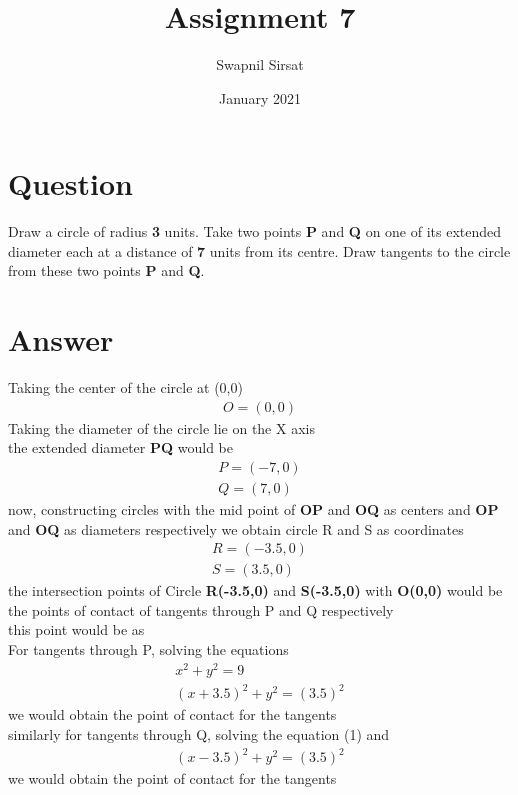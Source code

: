 \documentclass{article}
\title{Assignment 7}
\author{Swapnil Sirsat}
\date{January 2021}
\begin{document}
\maketitle

\section*{Question}
Draw a circle of radius \textbf{3} units. Take two points
\textbf{P} and \textbf{Q} on one of its extended diameter each
at a distance of \textbf{7} units from its centre. Draw
tangents to the circle from these two points \textbf{P}
and \textbf{Q}.
\section*{Answer}
Taking the center of the circle at (0,0)
\begin{gather*}
    O = (0,0)
\end{gather*}
Taking the diameter of the circle lie on the X axis \\
the extended diameter \textbf{PQ} would be
\begin{gather*}
    P = (-7,0)\\
    Q = (7,0)
\end{gather*}
now, constructing circles with the mid point of \textbf{OP} and \textbf{OQ} as centers and  \textbf{OP} and \textbf{OQ} as diameters respectively we obtain circle R and S as coordinates
\begin{gather*}
    R = (-3.5,0)\\
    S = (3.5,0)
\end{gather*}
the intersection points of Circle \textbf{R(-3.5,0)} and \textbf{S(-3.5,0)} with \textbf{O(0,0)} would be the points of contact of tangents through P and Q respectively
\\this point would be as
\\For tangents through P, solving the equations  
\begin{gather}
    x^{2} + y^{2} = 9\\
    (x+3.5)^{2} + y^{2} = (3.5)^{2}
\end{gather}
we would obtain the point of contact for the tangents\\
similarly for tangents through Q, solving the equation (1) and
\begin{gather}
    (x-3.5)^{2} + y^{2} = (3.5)^{2}
\end{gather}
we would obtain the point of contact for the tangents\\
\end{document}
